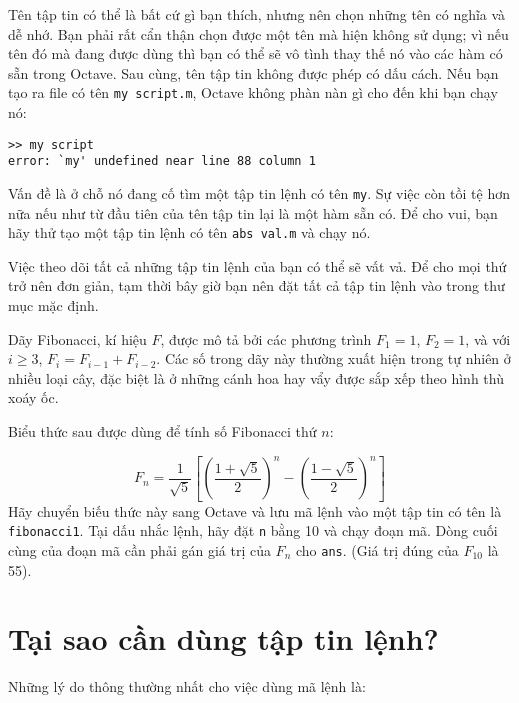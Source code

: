 \documentclass[12pt]{book}
\begin{document}
Tên tập tin có thể là bất cứ gì bạn thích, nhưng nên chọn những tên có
nghĩa và dễ nhớ. Bạn phải rất cẩn thận chọn được một tên mà hiện 
không sử dụng; vì nếu tên đó mà đang được dùng thì bạn có thể sẽ
vô tình thay thế nó vào các hàm có sẵn trong Octave. Sau cùng, tên
tập tin không được phép có dấu cách. Nếu bạn tạo ra file có tên
{\tt my script.m}, Octave không phàn nàn gì cho đến khi bạn chạy nó:

\begin{verbatim}
>> my script
error: `my' undefined near line 88 column 1
\end{verbatim}
%
Vấn đề là ở chỗ nó đang cố tìm một tập tin lệnh có tên {\tt my}.  Sự việc
còn tồi tệ hơn nữa nếu như từ đầu tiên của tên tập tin lại là một hàm
sẵn có. Để cho vui, bạn hãy thử tạo một tập tin lệnh có tên {\tt abs val.m}
và chạy nó.

Việc theo dõi tất cả những tập tin lệnh của bạn có thể sẽ vất vả. Để cho
mọi thứ trở nên đơn giản, tạm thời bây giờ bạn nên đặt tất cả tập tin 
lệnh vào trong thư mục mặc định.

\begin{ex}
Dãy Fibonacci, kí hiệu $F$, được mô tả bởi các phương trình 
$F_1 = 1$, $F_2 = 1$, và với $i \ge 3$, $F_{i} = F_{i-1} + F_{i-2}$.
Các số trong dãy này thường xuất hiện trong tự nhiên ở nhiều loại cây,
đặc biệt là ở những cánh hoa hay vẩy được sắp xếp theo hình thù
xoáy ốc.

Biểu thức sau được dùng để tính số Fibonacci thứ $n$:

\begin{equation}
F_n = \frac{1}{\sqrt{5}}
\left[ 
\left( \frac{1 + \sqrt{5}}{2} \right)^{n} -
\left( \frac{1 - \sqrt{5}}{2} \right)^{n}
\right]
\end{equation}
%
Hãy chuyển biếu thức này sang Octave và lưu mã lệnh vào
một tập tin có tên là {\tt fibonacci1}.  Tại dấu nhắc lệnh, hãy
đặt {\tt n} bằng 10 và chạy đoạn mã. Dòng cuối cùng của đoạn mã
cần phải gán giá trị của $F_n$ cho {\tt ans}.
(Giá trị đúng của $F_{10}$ là 55).
\end{ex}


\section{Tại sao cần dùng tập tin lệnh?}

Những lý do thông thường nhất cho việc dùng mã lệnh là:
\end{document}
